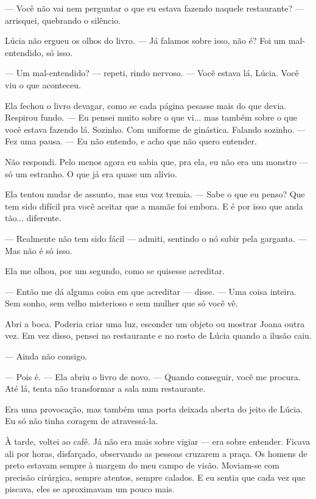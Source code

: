 — Você não vai nem perguntar o que eu estava fazendo naquele restaurante? — arrisquei, quebrando o silêncio.

Lúcia não ergueu os olhos do livro.  
— Já falamos sobre isso, não é? Foi um mal-entendido, só isso.

— Um mal-entendido? — repeti, rindo nervoso. — Você estava lá, Lúcia. Você viu o que aconteceu.

Ela fechou o livro devagar, como se cada página pesasse mais do que devia.  
Respirou fundo. — Eu pensei muito sobre o que vi... mas também sobre o que você estava fazendo lá. Sozinho. Com uniforme de ginástica. Falando sozinho. — Fez uma pausa. — Eu não entendo, e acho que não quero entender.

Não respondi.  
Pelo menos agora eu sabia que, pra ela, eu não era um monstro — só um estranho.  
O que já era quase um alívio.

Ela tentou mudar de assunto, mas sua voz tremia.  
— Sabe o que eu penso? Que tem sido difícil pra você aceitar que a mamãe foi embora. E é por isso que anda tão... diferente.

— Realmente não tem sido fácil — admiti, sentindo o nó subir pela garganta. — Mas não é só isso.

Ela me olhou, por um segundo, como se quisesse acreditar.

— Então me dá alguma coisa em que acreditar — disse. — Uma coisa inteira. Sem sonho, sem velho misterioso e sem mulher que só você vê.

Abri a boca. Poderia criar uma luz, esconder um objeto ou mostrar Joana outra vez. Em vez disso, pensei no restaurante e no rosto de Lúcia quando a ilusão caiu.

— Ainda não consigo.

— Pois é. — Ela abriu o livro de novo. — Quando conseguir, você me procura. Até lá, tenta não transformar a sala num restaurante.

Era uma provocação, mas também uma porta deixada aberta do jeito de Lúcia. Eu só não tinha coragem de atravessá-la.

\medskip

À tarde, voltei ao café.  
Já não era mais sobre vigiar — era sobre entender.  
Ficava ali por horas, disfarçado, observando as pessoas cruzarem a praça.  
Os homens de preto estavam sempre à margem do meu campo de visão.  
Moviam-se com precisão cirúrgica, sempre atentos, sempre calados.  
E eu sentia que cada vez que piscava, eles se aproximavam um pouco mais.

